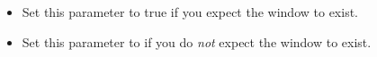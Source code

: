 \begin{itemize}
\item Set this parameter to true if you expect the window to exist.
\item Set this parameter to \gdrefbooleanfalse if you do \emph{not} expect the window to exist.
\end{itemize}
